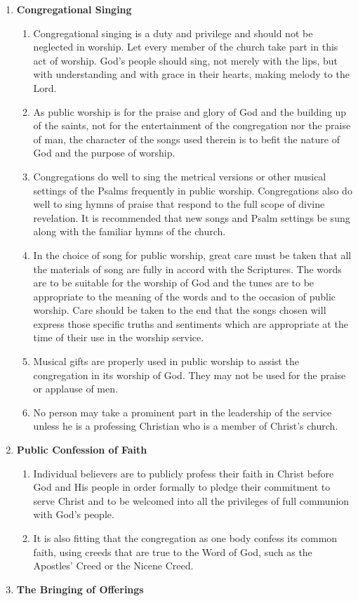 \documentclass[
]{book}
\providecommand{\tightlist}{%
  \setlength{\itemsep}{0pt}\setlength{\parskip}{0pt}}
\begin{document}
\begin{enumerate}
\def\labelenumi{\arabic{enumi}.}
\setcounter{enumi}{1}
\tightlist
\item
  \textbf{Congregational Singing}

  \begin{enumerate}
  \def\labelenumii{\alph{enumii}.}
  \tightlist
  \item
    Congregational singing is a duty and privilege and should not be neglected in worship. Let every member of the church take part in this act of worship. God's people should sing, not merely with the lips, but with understanding and with grace in their hearts, making melody to the Lord.
  \item
    As public worship is for the praise and glory of God and the building up of the saints, not for the entertainment of the congregation nor the praise of man, the character of the songs used therein is to befit the nature of God and the purpose of worship.
  \item
    Congregations do well to sing the metrical versions or other musical settings of the Psalms frequently in public worship. Congregations also do well to sing hymns of praise that respond to the full scope of divine revelation. It is recommended that new songs and Psalm settings be sung along with the familiar hymns of the church.
  \item
    In the choice of song for public worship, great care must be taken that all the materials of song are fully in accord with the Scriptures. The words are to be suitable for the worship of God and the tunes are to be appropriate to the meaning of the words and to the occasion of public worship. Care should be taken to the end that the songs chosen will express those specific truths and sentiments which are appropriate at the time of their use in the worship service.
  \item
    Musical gifts are properly used in public worship to assist the congregation in its worship of God. They may not be used for the praise or applause of men.
  \item
    No person may take a prominent part in the leadership of the service unless he is a professing Christian who is a member of Christ's church.
  \end{enumerate}
\item
  \textbf{Public Confession of Faith}

  \begin{enumerate}
  \def\labelenumii{\alph{enumii}.}
  \tightlist
  \item
    Individual believers are to publicly profess their faith in Christ before God and His people in order formally to pledge their commitment to serve Christ and to be welcomed into all the privileges of full communion with God's people.
  \item
    It is also fitting that the congregation as one body confess its common faith, using creeds that are true to the Word of God, such as the Apostles' Creed or the Nicene Creed.
  \end{enumerate}
\item
  \textbf{The Bringing of Offerings}


\end{enumerate}
\end{document}
